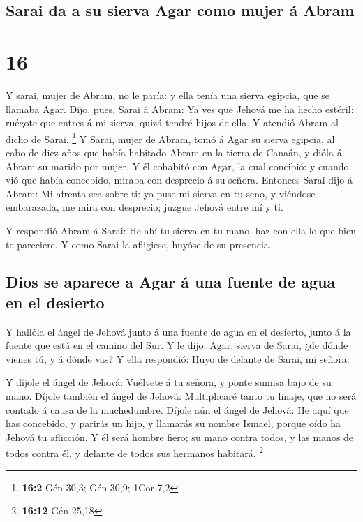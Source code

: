 \hypertarget{sarai-da-a-su-sierva-agar-como-mujer-uxe1-abram}{%
\subsection{Sarai da a su sierva Agar como mujer á
Abram}\label{sarai-da-a-su-sierva-agar-como-mujer-uxe1-abram}}

\hypertarget{section-15}{%
\section{16}\label{section-15}}

 Y sarai, mujer de Abram, no le paría: y ella tenía una
sierva egipcia, que se llamaba Agar.  Dijo, pues, Sarai á
Abram: Ya ves que Jehová me ha hecho estéril: ruégote que entres á mi
sierva; quizá tendré hijos de ella. Y atendió Abram al dicho de Sarai.
\footnote{\textbf{16:2} Gén 30,3; Gén 30,9; 1Cor 7,2}  Y
Sarai, mujer de Abram, tomó á Agar su sierva egipcia, al cabo de diez
años que había habitado Abram en la tierra de Canaán, y dióla á Abram su
marido por mujer.  Y él cohabitó con Agar, la cual concibió:
y cuando vió que había concebido, miraba con desprecio á su señora.
 Entonces Sarai dijo á Abram: Mi afrenta sea sobre ti: yo
puse mi sierva en tu seno, y viéndose embarazada, me mira con desprecio;
juzgue Jehová entre mí y ti.

 Y respondió Abram á Sarai: He ahí tu sierva en tu mano, haz
con ella lo que bien te pareciere. Y como Sarai la afligiese, huyóse de
su presencia.

\hypertarget{dios-se-aparece-a-agar-uxe1-una-fuente-de-agua-en-el-desierto}{%
\subsection{Dios se aparece a Agar á una fuente de agua en el
desierto}\label{dios-se-aparece-a-agar-uxe1-una-fuente-de-agua-en-el-desierto}}

 Y hallóla el ángel de Jehová junto á una fuente de agua en
el desierto, junto á la fuente que está en el camino del Sur.
 Y le dijo: Agar, sierva de Sarai, ¿de dónde vienes tú, y á
dónde vas? Y ella respondió: Huyo de delante de Sarai, mi señora.

 Y díjole el ángel de Jehová: Vuélvete á tu señora, y ponte
sumisa bajo de su mano.  Díjole también el ángel de Jehová:
Multiplicaré tanto tu linaje, que no será contado á causa de la
muchedumbre.  Díjole aún el ángel de Jehová: He aquí que
has concebido, y parirás un hijo, y llamarás su nombre Ismael, porque
oído ha Jehová tu aflicción.  Y él será hombre fiero; su
mano contra todos, y las manos de todos contra él, y delante de todos
sus hermanos habitará. \footnote{\textbf{16:12} Gén 25,18}

